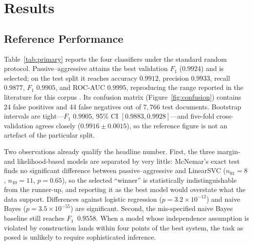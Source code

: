\documentclass[conference]{IEEEtran}
\newcommand{\Fone}{$F_1$}
\begin{document}
\section{Results}
\label{sec:results}

\subsection{Reference Performance}
\label{sec:results-primary}
Table~\ref{tab:primary} reports the four classifiers under the standard random
protocol. Passive--aggressive attains the best validation \Fone{} ($0.9924$)
and is selected; on the test split it reaches accuracy $0.9912$, precision
$0.9933$, recall $0.9877$, \Fone{} $0.9905$, and ROC-AUC $0.9995$, reproducing
the range reported in the literature for this corpus
\cite{ahmed2018detecting,khan2021benchmark}. Its confusion matrix
(Figure~\ref{fig:confusion}) contains 24 false positives and 44 false
negatives out of $7{,}766$ test documents. Bootstrap intervals are tight---\Fone{}
$0.9905$, 95\% CI $[0.9883, 0.9928]$---and five-fold cross-validation agrees
closely ($0.9916 \pm 0.0015$), so the reference figure is not an artefact of the
particular split.

Two observations already qualify the headline number. First, the three
margin- and likelihood-based models are separated by very little: McNemar's
exact test finds no significant difference between passive--aggressive and
LinearSVC ($n_{01}{=}8$, $n_{10}{=}11$, $p=0.65$), so the selected ``winner''
is statistically indistinguishable from the runner-up, and reporting it as the
best model would overstate what the data support. Differences against logistic
regression ($p=3.2\times10^{-12}$) and naive Bayes ($p=3.5\times10^{-55}$) are
significant. Second, the mis-specified naive Bayes baseline still reaches
\Fone{}~$0.9558$. When a model whose independence assumption is violated by
construction lands within four points of the best system, the task as posed is
unlikely to require sophisticated inference.
\end{document}
